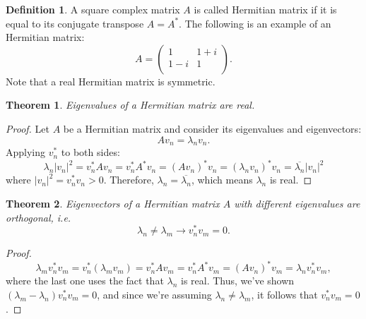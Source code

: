\documentclass{article}
\newtheorem{theorem}{Theorem}[section]
\theoremstyle{definition}
\newtheorem{definition}{Definition}[section]
\begin{document}
\begin{definition}
A square complex matrix $A$ is called Hermitian matrix if it is equal to its conjugate transpose $A=A^*$. The following is an example of an Hermitian matrix:
\begin{equation}
    A =
    \begin{pmatrix}
        1 & 1+i \\
        1-i & 1 \\
    \end{pmatrix}.
\end{equation}
Note that a real Hermitian matrix is symmetric.
\end{definition}

\begin{theorem}
Eigenvalues of a Hermitian matrix are real.
\end{theorem}
 
\begin{proof}
Let $A$ be a Hermitian matrix and consider its eigenvalues and eigenvectors:
\begin{equation}
    Av_n=\lambda_nv_n.
\end{equation}
Applying $v_n^*$ to both sides:
\begin{equation}
    \lambda_n |v_n|^2 = v_n^*Av_n = v_n^*A^*v_n = (Av_n)^*v_n = (\lambda_nv_n)^*v_n = \overline{\lambda_n}|v_n|^2
    \label{appendix-eq:eig}
\end{equation}
where $|v_n|^2=v_n^*v_n>0$. Therefore, $\lambda_n=\overline{\lambda_n}$, which means $\lambda_n$ is real.
\end{proof}

\begin{theorem}
Eigenvectors of a Hermitian matrix $A$ with different eigenvalues are orthogonal, i.e.
\begin{equation}
    \lambda_n\ne\lambda_m \to v_n^*v_m=0.
\end{equation}
\end{theorem}

\begin{proof}
\begin{equation}
    \lambda_mv_n^*v_m = v_n^*(\lambda_mv_m) = v_n^*Av_m = v_n^*A^*v_m = (Av_n)^*v_m = \lambda_nv_n^*v_m,
\end{equation}
where the last one uses the fact that $\lambda_n$ is real. Thus, we've shown $(\lambda_m - \lambda_n)v_n^*v_m = 0$, and since we're assuming $\lambda_n\ne\lambda_m$, it follows that $v_n^*v_m=0$.
\end{proof}
\end{document}
